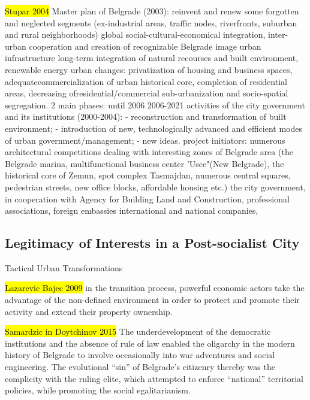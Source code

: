 \documentclass[11pt]{report}
\begin{document}
\hl{Stupar 2004}
Master plan of Belgrade (2003):
    reinvent and renew some forgotten and neglected  segments  (ex-industrial  areas,  traffic  nodes,  riverfronts,  suburban  and  rural neighborhoods)
    global  social-cultural-economical integration, inter-urban cooperation and creation of recognizable Belgrade image
    urban infrastructure
    long-term integration of natural recourses and built environment,
    renewable energy
urban changes:
    privatization  of  housing  and  business  spaces,  adequatecommercialization  of  urban  historical core,
    completion  of  residential  areas,
    decreasing  ofresidential/commercial  sub-urbanization  and  socio-spatial  segregation. 
2 main phases:
    until 2006
    2006-2021
activities of the city government and its institutions (2000-2004):
    -  reconstruction and transformation of built environment; 
    -  introduction  of  new,  technologically  advanced  and  efficient  modes  of  urban
    government/management; 
    -  new ideas. 
project initiators:
    numerous  architectural  competitions  dealing  with interesting  zones  of  Belgrade  area (the Belgrade marina, multifunctional business center 'Usce"(New Belgrade), the historical core of Zemun, spot complex Tasmajdan, numerous central squares, pedestrian streets, new office blocks, affordable housing etc.)
    the  city  government,  in  cooperation  with  Agency  for Building  Land  and  Construction,
    professional  associations,
    foreign  embassies
    international  and  national  companies,

\subsection{Legitimacy of Interests in a Post-socialist City}

Tactical Urban Transformations 

\hl{Lazarevic Bajec 2009}
in the transition process, powerful economic actors take the advantage of the non-defined environment in order to protect and promote their activity and extend their property ownership.

\hl{Samardzic in Doytchinov 2015}
The underdevelopment of the democratic institutions and the absence of rule of  law  enabled  the  oligarchy  in  the  modern  history  of  Belgrade  to  involve occasionally into war adventures and social engineering. The evolutional “sin” of Belgrade’s citizenry thereby was the complicity with the ruling elite, which attempted to enforce “national” territorial policies, while promoting the social egalitarianism.
\end{document}
